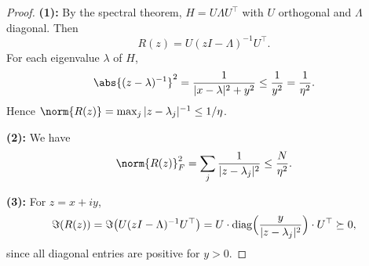\begin{proof}
\textbf{(1):} By the spectral theorem, $H = U \Lambda U^\top$ with $U$ orthogonal and $\Lambda$ diagonal. Then
\[
R(z) = U(zI - \Lambda)^{-1}U^\top.
\]
For each eigenvalue $\lambda$ of $H$,
\[
\abs{(z - \lambda)^{-1}}^2 = \frac{1}{|x - \lambda|^2 + y^2} \leq \frac{1}{y^2} = \frac{1}{\eta^2}.
\]
Hence $\norm{R(z)} = \max_j |z - \lambda_j|^{-1} \leq 1/\eta$.

\medskip
\noindent\textbf{(2):} We have
\[
\norm{R(z)}_F^2 = \sum_j \frac{1}{|z - \lambda_j|^2} \leq \frac{N}{\eta^2}.
\]

\medskip
\noindent\textbf{(3):} For $z = x + iy$,
\[
\Im(R(z)) = \Im\bigl(U(zI - \Lambda)^{-1}U^\top\bigr)
= U \cdot \mathrm{diag}\Bigl(\frac{y}{|z - \lambda_j|^2}\Bigr) \cdot U^\top \succeq 0,
\]
since all diagonal entries are positive for $y > 0$.
\end{proof}
